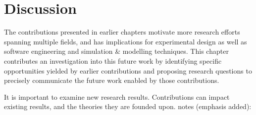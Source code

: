
\section{Discussion}\label{sec:future_work_conclusion}


The contributions presented in earlier chapters motivate more research efforts
spanning multiple fields, and has implications for experimental design as well
as software engineering and simulation \& modelling techniques. This chapter
contributes an investigation into this future work by identifying specific
opportunities yielded by earlier contributions and proposing research questions to
precisely communicate the future work enabled by those contributions.

It is important to examine new research results. Contributions can impact
existing results, and the theories they are founded upon.
\citet{kuhn2012structure} notes (emphasis added):

